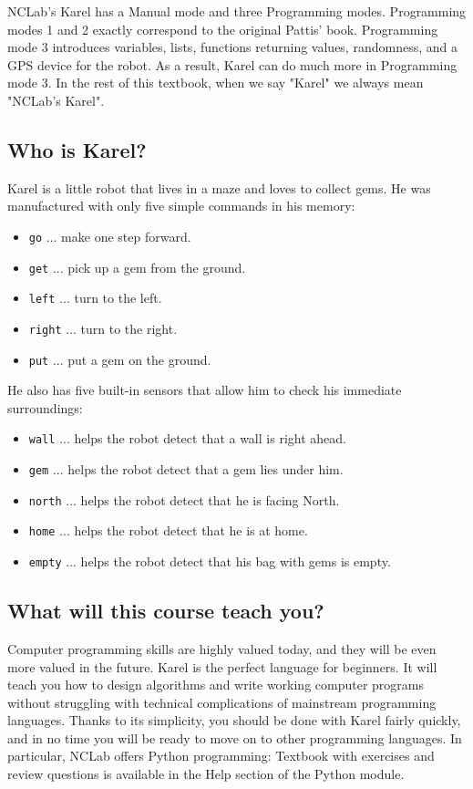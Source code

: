 NCLab's Karel has a Manual mode and three Programming modes. Programming 
modes 1 and 2 exactly correspond to the original Pattis' book. Programming mode 3 
introduces variables, lists, functions returning values, randomness, 
and a GPS device for the robot. As a result, Karel can do much more in Programming 
mode 3. In the rest of this textbook, when we say "Karel" we always mean "NCLab's Karel".

\subsection{Who is Karel?}

Karel is a little robot that lives in a maze and loves to collect gems.
He was manufactured with only five simple commands in his memory:

\begin{itemize}
\item {\color{blue} \tt go} ... make one step forward.
\item {\color{blue} \tt get} ... pick up a gem from the ground. 
\item {\color{blue} \tt left} ... turn to the left.
\item {\color{blue} \tt right} ... turn to the right. 
\item {\color{blue} \tt put} ... put a gem on the ground. 
\end{itemize}
He also has five built-in sensors that allow him to check his immediate surroundings:
\begin{itemize}
\item {\color{ForestGreen} \tt wall} ... helps the robot detect that a wall is right ahead.
\item {\color{ForestGreen} \tt gem} ... helps the robot detect that a gem lies under him.
\item {\color{ForestGreen} \tt north} ... helps the robot detect that he is facing North.
\item {\color{ForestGreen} \tt home} ... helps the robot detect that he is at home.
\item {\color{ForestGreen} \tt empty} ... helps the robot detect that his bag with gems is empty.
\end{itemize}

\subsection{What will this course teach you?}

Computer programming skills are highly valued today, and they will be even more 
valued in the future. Karel is the perfect language for beginners. It will teach
you how to design algorithms and write working computer programs without struggling 
with technical complications of mainstream programming languages. Thanks to its 
simplicity, you should be done with Karel fairly quickly, and in no time you will be 
ready to move on to other programming languages. In particular, NCLab offers
Python programming: Textbook with exercises and review questions is available in
the Help section of the Python module.  

